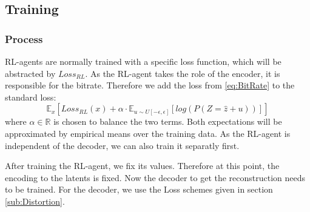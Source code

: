 



\subsection{Training}
    \subsubsection{Process}
        RL-agents are normally trained with a specific loss function, which will be
        abstracted by $Loss_{RL}$. As the RL-agent takes the role of the encoder, it
        is responsible for the bitrate. Therefore we add the loss from
        \ref{eq:BitRate} to the standard loss:
        \begin{equation}\label{eq:RL_Training_Loss}
            \mathbb{E}_{x}[Loss_{RL}(x) + \alpha\cdot \mathbb{E}_{u \sim U[-\epsilon, \epsilon]}[log(P(Z=\hat{z} + u))]]
        \end{equation} where $\alpha \in \mathbb{R}$ is chosen to balance the two terms.
        Both expectations will be approximated by empirical means over the training
        data. As the RL-agent is independent of the decoder, we can also train it
        separatly first.

        After training the RL-agent, we fix its values. Therefore at this point,
        the encoding to the latents is fixed. Now the decoder to get the
        reconstruction needs to be trained. For the decoder, we use the Loss
        schemes given in section \ref{sub:Distortion}.


